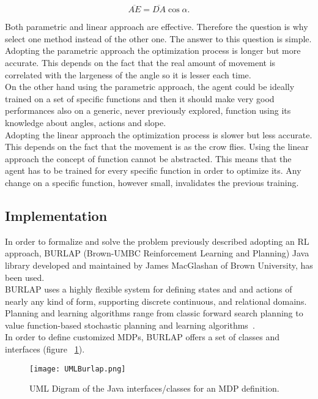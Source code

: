 \begin{equation}
	\overline{AE} = \overline{DA} \cos \alpha.
\end{equation}

Both parametric and linear approach are effective. Therefore the question is why select one method instead of the other one. The answer to this question is simple. Adopting the parametric approach the optimization process is longer but more accurate. This depends on the fact that the real amount of movement is correlated with the largeness of the angle so it is lesser each time. \\

On the other hand using the parametric approach, the agent could be ideally trained on a set of specific functions and then it should make very good performances also on a generic, never previously explored, function using its knowledge about angles, actions and slope. \\

Adopting the linear approach the optimization process is slower but less accurate. This depends on the fact that the movement is as the crow flies. Using the linear approach the concept of function cannot be abstracted. This means that the agent has to be trained for every specific function in order to optimize its. Any change on a specific function, however small, invalidates the previous training.

\subsection{Implementation}

In order to formalize and solve the problem previously described adopting an RL approach, BURLAP (Brown-UMBC Reinforcement Learning and Planning) Java library developed and maintained by James MacGlashan of Brown University, has been used. \\

BURLAP uses a highly flexible system for defining states and and actions of nearly any kind of form, supporting discrete continuous, and relational domains. Planning and learning algorithms range from classic forward search planning to value function-based stochastic planning and learning algorithms~\cite{BURLAPSite}. \\

In order to define customized MDPs, BURLAP offers a set of classes and interfaces (figure ~\ref{fig:UMLBurlap}).

\begin{figure} [h!]
	\texttt{[image: UMLBurlap.png]}
	\caption{UML Digram of the Java interfaces/classes for an MDP definition.}
	\label{fig:UMLBurlap}
\end{figure}

